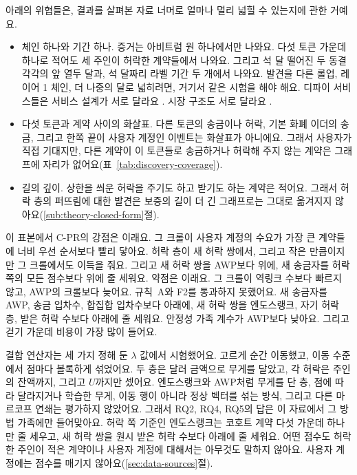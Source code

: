 
아래의 위협들은, 결과를 살펴본 자료 너머로 얼마나 멀리 넓힐 수 있는지에 관한 거예요.

\begin{itemize}
\item 체인 하나와 기간 하나. 증거는 아비트럼 원 하나에서만 나와요. 다섯 토큰 가운데 하나로 적어도 세 주인이 허락한 계약들에서 나와요. 그리고 석 달 떨어진 두 동결 각각의 앞 열두 달과, 석 달짜리 라벨 기간 두 개에서 나와요. 발견을 다른 롤업, 레이어 1 체인, 더 나중의 달로 넓히려면, 거기서 같은 시험을 해야 해요. 디파이 서비스들은 서비스 설계가 서로 달라요 \parencite{werner2022sok}. 시장 구조도 서로 달라요 \parencite{schar2021defi}.
\item 다섯 토큰과 계약 사이의 화살표. 다른 토큰의 송금이나 허락, 기본 화폐 이더의 송금, 그리고 한쪽 끝이 사용자 계정인 이벤트는 화살표가 아니에요. 그래서 사용자가 직접 기대지만, 다른 계약이 이 토큰들로 송금하거나 허락해 주지 않는 계약은 그래프에 자리가 없어요(표~\ref{tab:discovery-coverage}).
\item 길의 깊이. 상한을 씌운 허락을 주기도 하고 받기도 하는 계약은 적어요. 그래서 허락 층의 퍼뜨림에 대한 발견은 보증의 길이 더 긴 그래프로는 그대로 옮겨지지 않아요(\ref{sub:theory-closed-form}절).
\end{itemize}


이 표본에서 \mbox{C-PR}의 강점은 이래요. 그 크롤이 사용자 계정의 수요가 가장 큰 계약들에 너비 우선 순서보다 빨리 닿아요. 허락 층이 새 허락 쌍에서, 그리고 작은 만큼이지만 그 크롤에서도 이득을 줘요. 그리고 새 허락 쌍을 AWP보다 위에, 새 송금자를 허락 쪽의 모든 점수보다 위에 줄 세워요. 약점은 이래요. 그 크롤이 역링크 수보다 빠르지 않고, AWP의 크롤보다 늦어요. 규칙~A와 F2를 통과하지 못했어요. 새 송금자를 AWP, 송금 입차수, 합집합 입차수보다 아래에, 새 허락 쌍을 엔도스랭크, 자기 허락 층, 받은 허락 수보다 아래에 줄 세워요. 안정성 가족 계수가 AWP보다 낮아요. 그리고 걷기 가운데 비용이 가장 많이 들어요.

결합 연산자는 세 가지 정해 둔 $\lambda$ 값에서 시험했어요. 고르게 순간 이동했고, 이동 수준에서 점마다 볼록하게 섞었어요. 두 층은 달러 금액으로 무게를 달았고, 각 허락은 주인의 잔액까지, 그리고 $U$까지만 셌어요. 엔도스랭크와 AWP처럼 무게를 단 층, 점에 따라 달라지거나 학습한 무게, 이동 행이 아니라 정상 벡터를 섞는 방식, 그리고 다른 마르코프 연쇄는 평가하지 않았어요. 그래서 RQ2, RQ4, RQ5의 답은 이 자료에서 그 방법 가족에만 들어맞아요. 허락 쪽 기준인 엔도스랭크는 코호트 계약 다섯 가운데 하나만 줄 세우고, 새 허락 쌍을 원시 받은 허락 수보다 아래에 줄 세워요. 어떤 점수도 허락한 주인이 적은 계약이나 사용자 계정에 대해서는 아무것도 말하지 않아요. 사용자 계정에는 점수를 매기지 않아요(\ref{sec:data-sources}절).

